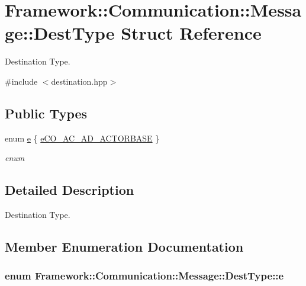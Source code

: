 \hypertarget{structFramework_1_1Communication_1_1Message_1_1DestType}{
\section{Framework::Communication::Message::DestType Struct Reference}
\label{structFramework_1_1Communication_1_1Message_1_1DestType}
}


Destination Type.  


{\ttfamily \#include $<$destination.hpp$>$}\subsection*{Public Types}
\begin{DoxyCompactItemize}
\item 
enum \hyperlink{structFramework_1_1Communication_1_1Message_1_1DestType_ad65d11369deab210fbdbdd36cad21372}{e} \{ \hyperlink{structFramework_1_1Communication_1_1Message_1_1DestType_ad65d11369deab210fbdbdd36cad21372a8ebb79626e8dcdf349c8f8d4d73b47b3}{eCO\_\-AC\_\-AD\_\-ACTORBASE}
 \}
\begin{DoxyCompactList}\small\item\em enum \item\end{DoxyCompactList}\end{DoxyCompactItemize}


\subsection{Detailed Description}
Destination Type. 

\subsection{Member Enumeration Documentation}
\hypertarget{structFramework_1_1Communication_1_1Message_1_1DestType_ad65d11369deab210fbdbdd36cad21372}{
\subsubsection[{e}]{\setlength{\rightskip}{0pt plus 5cm}enum {\bf Framework::Communication::Message::DestType::e}}}
\label{structFramework_1_1Communication_1_1Message_1_1DestType_ad65d11369deab210fbdbdd36cad21372}


